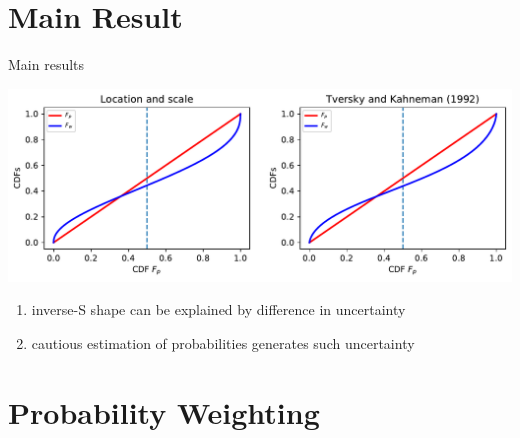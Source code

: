 \section{Main Result}

\begin{frame}{Main results}
\begin{center}
	\includegraphics[width=.9\textwidth]{../../figs/Our_result_LocScale_vs_KT.pdf}
\end{center}
\begin{enumerate}
	\item	inverse-S shape can be explained by difference in uncertainty
	\item cautious estimation of probabilities generates such uncertainty
\end{enumerate}
\label{MainResults}
\hyperlink{weight_vs_estimate}{}
\end{frame}

\section{Probability Weighting}

